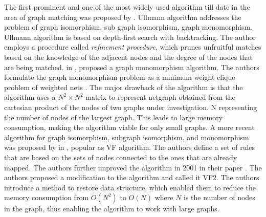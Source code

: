 The first prominent and one of the most widely used algorithm till date in the area of graph matching was proposed by \citeauthor{Ullmann:1976:ASI:321921.321925} \cite{Ullmann:1976:ASI:321921.321925}.
Ullmann algorithm addresses the problem of graph isomorphism, sub graph isomorphism, graph monomorphism. Ullmann algorithm is based on  depth-first search with backtracking.
The author employs a procedure called \textit{refinement procedure}, which prunes unfruitful matches based on the knowledge of the adjacent nodes and the degree of the nodes that are being matched.
\citeauthor{4308468} in \cite{4308468}, proposed a graph monomorphism algorithm.
The authors formulate the graph monomorphism problem as a minimum weight clique problem of weighted nets .
The major drawback of the algorithm is that the algorithm uses a $N^2 \times N^2$ matrix to represent netgraph obtained from the cartesian product of the nodes of two graphs under investigation.
N representing the number of nodes of the largest graph. This leads to large memory consumption, making the algorithm viable for only small graphs.
A more recent algorithm for graph isomorphism, subgraph isomorphism, and monomorphism was proposed by \citeauthor{906251} in \cite{906251}, popular as VF algorithm. 
The authors define a set of rules that are based on the sets of nodes connected to the ones that are already mapped.
The authors further improved the algorithm in 2001 in their paper \cite{cordella2001improved}. 
The authors proposed a modification to the algorithm and called it VF2.
The authors introduce a method to restore data structure, which enabled them to reduce the memory consumption from $O(N^2)$ to $O(N)$ where $N$ is the number of nodes in the graph, thus enabling the algorithm to work with large graphs.

